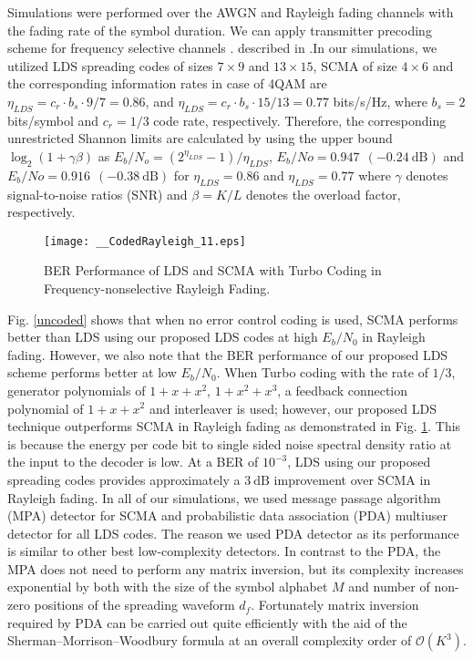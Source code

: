 \documentclass[journal,comsoc]{IEEEtran}
\begin{document}
 Simulations were performed over the AWGN and Rayleigh fading channels with the fading rate of the symbol duration. We can apply transmitter precoding scheme for frequency selective channels \cite{MichelHanzo2021}. \iffalse The greater performance gain was achieved in Figs. \ref{CodedAWGN} - \ref{CodedRayleigh} in terms of BER when using the long-term evolution (LTE) turbo channel encoder, with the interleaver, which is based on the quadratic permutation polynomial scheme. \fi  \iffalse described in \cite{Zarrinkoub2014}.\fi In our simulations, we utilized LDS spreading codes of sizes $7 \times 9$ and $13 \times 15$, SCMA \cite{Altera5G} of size $4 \times 6$ and the corresponding information rates in case of 4QAM are $\eta_{LDS}= c_r \cdot b_s\cdot 9/7=0.86 $, and $\eta_{LDS}=c_r \cdot b_s\cdot 15/13=0.77$ bits/s/Hz, where $b_s=2$ bits/symbol and $c_r=1/3$ code rate, respectively.
 Therefore, the corresponding unrestricted Shannon limits are calculated by using the upper bound $\log_2{(1+\gamma \beta)}$ as $E_b/N_o = (2^{\eta_{LDS}}-1)/\eta_{LDS}$, $E_b/No = 0.947 \:\:(-0.24\: \text{dB})$ and  $E_b/No = 0.916 \:\:(-0.38 \:\text{dB})$ for $\eta_{LDS}=0.86$ and $\eta_{LDS}=0.77$ where $\gamma$ denotes signal-to-noise ratios (SNR) and $\beta =K/L$ denotes the overload factor, respectively.
 \begin{figure}[h]
\vspace{-.4cm}
	\centering
	\texttt{[image: \_\_CodedRayleigh\_11.eps]}
	\caption{BER Performance of LDS and SCMA with Turbo Coding in Frequency-nonselective Rayleigh Fading.}\label{CodedRayleigh}
	\vspace{-.2cm}
\end{figure}
Fig. \ref{uncoded} shows that when no error control coding is used, SCMA performs better than LDS using our proposed LDS codes at high $E_b/N_0$ in Rayleigh fading. However, we also note that the BER performance of our proposed LDS scheme performs better at low $E_b/N_0$. When Turbo coding with the rate of $1/3$, generator polynomials of $1+x+x^2$, $1+x^2+x^3$, a feedback connection polynomial of $1+x+x^2$ and interleaver is used; however, our proposed LDS technique outperforms SCMA in Rayleigh fading as demonstrated in Fig. \ref{CodedRayleigh}.  This is because the energy per code bit to single sided noise spectral density ratio at the input to the decoder is low. At a BER of $10^{-3}$, LDS using our proposed spreading codes provides approximately a $3\:\text{dB}$ improvement over SCMA in Rayleigh fading. In all of our simulations, we used message passage algorithm (MPA) detector for SCMA and probabilistic data association (PDA) \cite{Pattipati2004} multiuser detector for all LDS codes. The reason we used PDA detector as its performance is similar to other best low-complexity detectors. In contrast to the PDA, the MPA does not need to perform any matrix inversion, but its complexity increases exponential by both with the size of the symbol alphabet $M$ and number of non-zero positions of the spreading waveform $d_f$. Fortunately matrix inversion required by PDA can be carried out quite efficiently with the aid of the Sherman–Morrison–Woodbury formula at an overall complexity order of $\mathcal{O}(K^3)$. 
\vspace{-.3cm}
\end{document}
